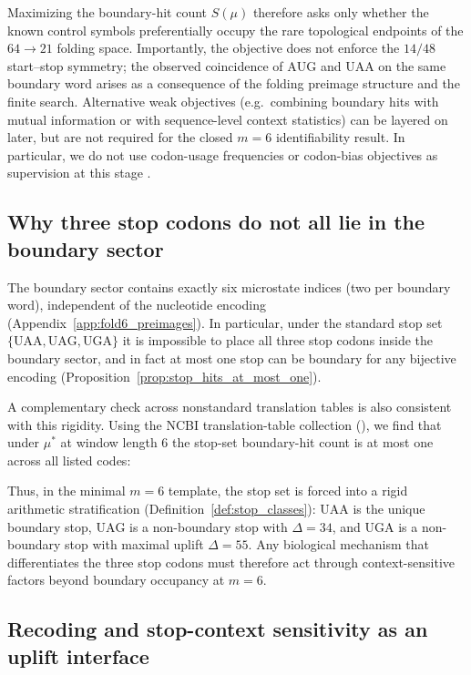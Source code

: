 Maximizing the boundary-hit count $S(\mu)$ therefore asks only whether the known control symbols preferentially occupy the rare topological endpoints of the $64\to 21$ folding space.
Importantly, the objective does not enforce the $14/48$ start--stop symmetry; the observed coincidence of $\mathrm{AUG}$ and $\mathrm{UAA}$ on the same boundary word arises as a consequence of the folding preimage structure and the finite search.
Alternative weak objectives (e.g.\ combining boundary hits with mutual information or with sequence-level context statistics) can be layered on later, but are not required for the closed $m=6$ identifiability result.
In particular, we do not use codon-usage frequencies or codon-bias objectives as supervision at this stage \cite{SharpLi1987,HershbergPetrov2008}.

\subsection{Why three stop codons do not all lie in the boundary sector}
\label{sec:stops_not_all_boundary}

The boundary sector contains exactly six microstate indices (two per boundary word), independent of the nucleotide encoding (Appendix~\ref{app:fold6_preimages}).
In particular, under the standard stop set $\{\mathrm{UAA,UAG,UGA}\}$ it is impossible to place all three stop codons inside the boundary sector, and in fact at most one stop can be boundary for any bijective encoding (Proposition~\ref{prop:stop_hits_at_most_one}).
\medskip

\noindent A complementary check across nonstandard translation tables is also consistent with this rigidity.
Using the NCBI translation-table collection (), we find that under $\mu^\ast$ at window length $6$ the stop-set boundary-hit count is at most one across all listed codes:
\cite{NCBIGCPRT,NCBIGeneticCodes}


Thus, in the minimal $m=6$ template, the stop set is forced into a rigid arithmetic stratification (Definition~\ref{def:stop_classes}): $\mathrm{UAA}$ is the unique boundary stop, $\mathrm{UAG}$ is a non-boundary stop with $\Delta=34$, and $\mathrm{UGA}$ is a non-boundary stop with maximal uplift $\Delta=55$.
Any biological mechanism that differentiates the three stop codons must therefore act through context-sensitive factors beyond boundary occupancy at $m=6$.

\subsection{Recoding and stop-context sensitivity as an uplift interface}
\label{sec:recoding_uplift_interface}


